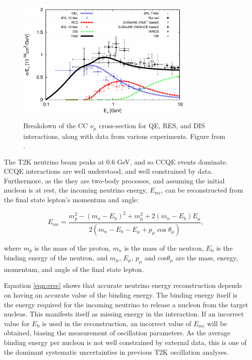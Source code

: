 \begin{figure}[!htbp]
\centering
\includegraphics*[width=0.8\textwidth,clip]{figs/xsections}
\caption{Breakdown of the CC $\nu_\mu$ cross-section for QE, RES, and DIS interactions, along with data from various experiments. Figure from \cite{nuxsec}.
} \label{xsecpot}
\end{figure}

The T2K neutrino beam peaks at 0.6 GeV, and so CCQE events dominate. CCQE interactions are well understood, and well constrained by data. Furthermore, as the they are two-body processes, and assuming the initial nucleon is at rest, the incoming neutrino energy, $E_\mathrm{rec}$, can be reconstructed from the final state lepton's momentum and angle:

\begin{equation}
E_\mathrm{rec} = \frac{m_p^2 - (m_n - E_{\mathrm{b}})^2 + m_\mu^2 + 2(m_n - E_{\mathrm{b}})E_\mu}{2(m_n - E_{\mathrm{b}} - E_\mu + p_\mu \cos \theta_\mu)},
\label{eqn:erec}
\end{equation}

where $m_p$ is the mass of the proton, $m_n$ is the mass of the neutron, $E_{\mathrm{b}}$ is the binding energy of the neutron, and $m_\mu$, $E_\mu$, $p_\mu$ and cos$\theta_\mu$ are the mass, energy, momentum, and angle of the final state lepton.

Equation \ref{eqn:erec} shows that accurate neutrino energy reconstruction depends on having an accurate value of the binding energy. The binding energy itself is the energy required for the incoming neutrino to release a nucleon from the target nucleus. This manifests itself as missing energy in the interaction. If an incorrect value for $E_{\mathrm{b}}$ is used in the reconstruction, an incorrect value of $E_\mathrm{rec}$ will be obtained, biasing the measurement of oscillation parameters. As the average binding energy per nucleon is not well constrained by external data, this is one of the dominant systematic uncertainties in previous T2K oscillation analyses.

